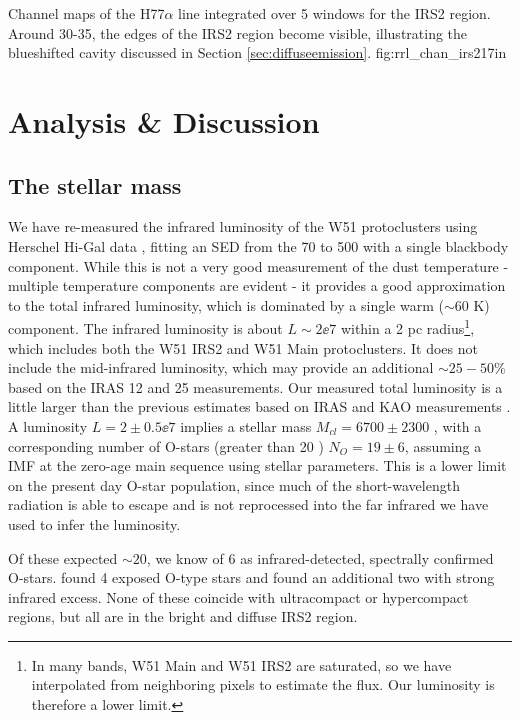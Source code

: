 {Channel maps of the H77$\alpha$ line integrated over 5 \kms windows
for the IRS2 region.  Around 30-35\kms, the edges of the IRS2 region become
visible, illustrating the blueshifted cavity discussed in Section
\ref{sec:diffuseemission}.}
{fig:rrl_chan_irs2}{1}{7in}


\section{Analysis \& Discussion}
\subsection{The stellar mass}
\label{sec:stellarmass}

We have re-measured the infrared luminosity of the W51 protoclusters using Herschel
Hi-Gal data \citep{Molinari2010a,Traficante2011a}, fitting an SED from the 70
to 500 \um with a single blackbody component.
While this is not a very good
measurement of the dust temperature - multiple temperature components are
evident \citep{Sievers1991a} - it provides a good approximation to the total
infrared luminosity, which is dominated by a single warm ($\sim60$ K)
component.  The infrared luminosity is about $L\sim2\ee{7}$ \lsun within a 2 pc
radius\footnote{In many bands, W51 Main and W51 IRS2 are
saturated, so we have interpolated from neighboring pixels to estimate the flux.
Our luminosity is therefore a lower limit.}, which includes
both the W51 IRS2 and W51 Main protoclusters.  It does not include the
mid-infrared luminosity, which may provide an additional $\sim25-50\%$ based on
the IRAS 12 and 25 \um measurements.  Our measured total luminosity is a little
larger than the previous estimates based on IRAS and KAO measurements
\citep{Harvey1986a,Sievers1991a}.  A luminosity $L=2\pm0.5\ee{7}$ \lsun implies
a stellar mass $M_{cl} = 6700 \pm 2300$ \msun, with a corresponding number of
O-stars (greater than 20 \msun) $N_O = 19 \pm 6$, assuming a
\citet{Kroupa2001a} IMF at the zero-age main sequence using \citet{Vacca1996a}
stellar parameters.  This is a lower limit on the present day O-star population,
since much of the short-wavelength radiation is able to escape and is not
reprocessed into the far infrared we have used to infer the luminosity.

Of these expected $\sim20$, we know of 6 as infrared-detected, spectrally
confirmed O-stars.  \citet{Figueredo2008a} found 4 exposed O-type stars and
\citet{Barbosa2008a} found an additional two with strong infrared excess.  None
of these coincide with ultracompact or hypercompact \hii regions, but all are
in the bright and diffuse IRS2 region.

